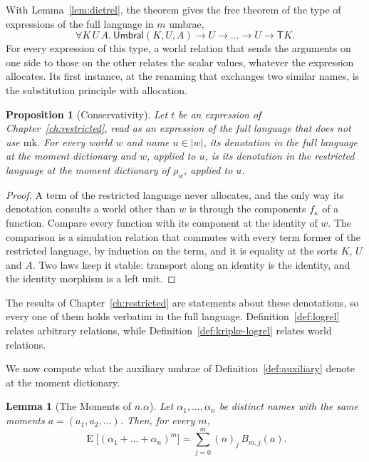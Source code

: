 \documentclass[11pt,a4paper]{report}
\theoremstyle{plain}
\newtheorem{proposition}[theorem]{Proposition}
\newtheorem{lemma}[theorem]{Lemma}
\theoremstyle{definition}
\theoremstyle{remark}
\newcommand{\E}{\operatorname{E}}
\newcommand{\Umbral}{\mathsf{Umbral}}
\newcommand{\T}{\mathsf{T}}
\newcommand{\mk}{\mathrm{mk}}
\begin{document}
With Lemma~\ref{lem:dictrel}, the theorem gives the free theorem of the type of
expressions of the full language in $m$ umbrae,
\[
  \forall K\,U\,A.\ \Umbral(K, U, A) \to U \to \dots \to U \to \T K .
\]
For every expression of this type, a world
relation that sends the arguments on one side to those on the other relates the
scalar values, whatever the expression allocates. Its first
instance, at the renaming that exchanges two similar names, is the substitution
principle with allocation.

\begin{proposition}[Conservativity]
\label{prop:conservative}
Let $t$ be an expression of Chapter~\ref{ch:restricted}, read as an expression of the full
language that does not use $\mk$. For every world $w$ and name $u \in |w|$, its
denotation in the full language at the moment dictionary and $w$, applied to $u$,
is its denotation in the restricted language at the moment dictionary of $\rho_w$, applied to $u$.
\end{proposition}

\begin{proof}
A term of the restricted language never allocates, and the only way its denotation consults a
world other than $w$ is through the components $f_\kappa$ of a function. Compare
every function with its component at the identity of $w$. The comparison is a
simulation relation that commutes with every term former of the restricted language, by
induction on the term, and it is equality at the sorts $K$, $U$ and $A$. Two laws
keep it stable: transport along an identity is the identity, and the identity
morphism is a left unit.
\end{proof}

The results of Chapter~\ref{ch:restricted} are statements about these denotations, so
every one of them holds verbatim in the full language. Definition~\ref{def:logrel} relates arbitrary
relations, while Definition~\ref{def:kripke-logrel} relates world relations.

We now compute what the auxiliary umbrae of Definition~\ref{def:auxiliary}
denote at the moment dictionary.

\begin{lemma}[The Moments of $n.\alpha$]
\label{lem:dotmoments}
Let $\alpha_1, \dots, \alpha_n$ be distinct names with the same moments
$a = (a_1, a_2, \dots)$. Then, for every $m$,
\[
  \E\bigl[(\alpha_1 + \dots + \alpha_n)^m\bigr]
    = \sum_{j=0}^{m} (n)_j\, B_{m,j}(a) .
\]
\end{lemma}
\end{document}
